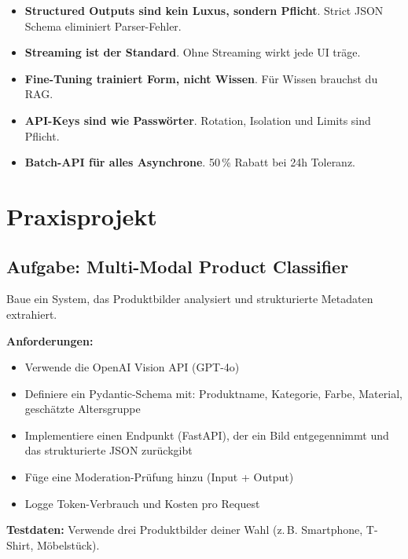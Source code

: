 \begin{merke}
\begin{itemize}
    \item \textbf{Structured Outputs sind kein Luxus, sondern Pflicht}. Strict JSON Schema eliminiert Parser-Fehler.
    \item \textbf{Streaming ist der Standard}. Ohne Streaming wirkt jede UI träge.
    \item \textbf{Fine-Tuning trainiert Form, nicht Wissen}. Für Wissen brauchst du RAG.
    \item \textbf{API-Keys sind wie Passwörter}. Rotation, Isolation und Limits sind Pflicht.
    \item \textbf{Batch-API für alles Asynchrone}. 50\,\% Rabatt bei 24h Toleranz.
\end{itemize}
\end{merke}

\section{Praxisprojekt}

\subsection{Aufgabe: Multi-Modal Product Classifier}

Baue ein System, das Produktbilder analysiert und strukturierte Metadaten extrahiert.

\textbf{Anforderungen:}
\begin{itemize}[leftmargin=*]
    \item Verwende die OpenAI Vision API (GPT-4o)
    \item Definiere ein Pydantic-Schema mit: Produktname, Kategorie, Farbe, Material, geschätzte Altersgruppe
    \item Implementiere einen Endpunkt (FastAPI), der ein Bild entgegennimmt und das strukturierte JSON zurückgibt
    \item Füge eine Moderation-Prüfung hinzu (Input + Output)
    \item Logge Token-Verbrauch und Kosten pro Request
\end{itemize}

\textbf{Testdaten:} Verwende drei Produktbilder deiner Wahl (z.\,B. Smartphone, T-Shirt, Möbelstück).

